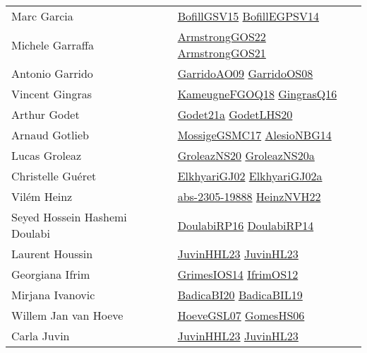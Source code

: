 {\begin{longtable}{p{4cm}p{20cm}}
Marc Garcia & \href{papers/BofillGSV15.pdf}{BofillGSV15}\cite{BofillGSV15} \href{papers/BofillEGPSV14.pdf}{BofillEGPSV14}\cite{BofillEGPSV14} \\
Michele Garraffa & \href{papers/ArmstrongGOS22.pdf}{ArmstrongGOS22}\cite{ArmstrongGOS22} \href{papers/ArmstrongGOS21.pdf}{ArmstrongGOS21}\cite{ArmstrongGOS21} \\
Antonio Garrido & \href{articles/GarridoAO09.pdf}{GarridoAO09}\cite{GarridoAO09} \href{articles/GarridoOS08.pdf}{GarridoOS08}\cite{GarridoOS08} \\
Vincent Gingras & \href{papers/KameugneFGOQ18.pdf}{KameugneFGOQ18}\cite{KameugneFGOQ18} \href{}{GingrasQ16}\cite{GingrasQ16} \\
Arthur Godet & \href{}{Godet21a}\cite{Godet21a} \href{papers/GodetLHS20.pdf}{GodetLHS20}\cite{GodetLHS20} \\
Arnaud Gotlieb & \href{papers/MossigeGSMC17.pdf}{MossigeGSMC17}\cite{MossigeGSMC17} \href{papers/AlesioNBG14.pdf}{AlesioNBG14}\cite{AlesioNBG14} \\
Lucas Groleaz & \href{papers/GroleazNS20.pdf}{GroleazNS20}\cite{GroleazNS20} \href{}{GroleazNS20a}\cite{GroleazNS20a} \\
Christelle Gu{\'{e}}ret & \href{papers/ElkhyariGJ02.pdf}{ElkhyariGJ02}\cite{ElkhyariGJ02} \href{papers/ElkhyariGJ02a.pdf}{ElkhyariGJ02a}\cite{ElkhyariGJ02a} \\
Vil{\'{e}}m Heinz & \href{articles/abs-2305-19888.pdf}{abs-2305-19888}\cite{abs-2305-19888} \href{articles/HeinzNVH22.pdf}{HeinzNVH22}\cite{HeinzNVH22} \\
Seyed Hossein Hashemi Doulabi & \href{}{DoulabiRP16}\cite{DoulabiRP16} \href{papers/DoulabiRP14.pdf}{DoulabiRP14}\cite{DoulabiRP14} \\
Laurent Houssin & \href{papers/JuvinHHL23.pdf}{JuvinHHL23}\cite{JuvinHHL23} \href{papers/JuvinHL23.pdf}{JuvinHL23}\cite{JuvinHL23} \\
Georgiana Ifrim & \href{articles/GrimesIOS14.pdf}{GrimesIOS14}\cite{GrimesIOS14} \href{papers/IfrimOS12.pdf}{IfrimOS12}\cite{IfrimOS12} \\
Mirjana Ivanovic & \href{}{BadicaBI20}\cite{BadicaBI20} \href{}{BadicaBIL19}\cite{BadicaBIL19} \\
Willem Jan van Hoeve & \href{papers/HoeveGSL07.pdf}{HoeveGSL07}\cite{HoeveGSL07} \href{papers/GomesHS06.pdf}{GomesHS06}\cite{GomesHS06} \\
Carla Juvin & \href{papers/JuvinHHL23.pdf}{JuvinHHL23}\cite{JuvinHHL23} \href{papers/JuvinHL23.pdf}{JuvinHL23}\cite{JuvinHL23} \\

\end{longtable}}
